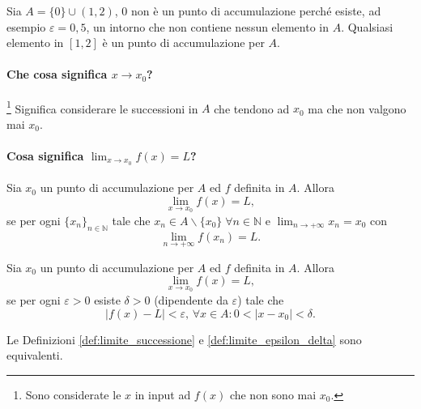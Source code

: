 \begin{example}
    Sia $A=\{0\}\cup(1,2)$, 0 non è un punto di accumulazione perché esiste, ad esempio $\varepsilon = 0,5$, un intorno che non contiene nessun elemento in $A$. Qualsiasi elemento in $[1,2]$ è un punto di accumulazione per $A$.
\end{example}

\paragraph{Che cosa significa $x\rightarrow x_0$?}\footnote{Sono considerate le $x$ in input ad $f(x)$ che non sono mai $x_0$.} Significa considerare le successioni in $A$ che tendono ad $x_0$ ma che non valgono mai $x_0$.

\paragraph{Cosa significa $\lim_{x\rightarrow x_0}f(x)=L$?}

\begin{definition}\label{def:limite_successione}
    Sia $x_0$ un punto di accumulazione per $A$ ed $f$ definita in $A$. Allora
    \begin{equation*}
        \lim_{x\rightarrow x_0}f(x)=L,
    \end{equation*}
    se per ogni $\{x_n\}_{n\in\mathbb N}$ tale che $x_n\in A\backslash\{x_0\}\;\forall n\in\mathbb N$ e $\lim_{n\rightarrow+\infty}x_n=x_0$ con
    \begin{equation*}
        \lim_{n\rightarrow+\infty}f(x_n)=L.
    \end{equation*}
\end{definition}

\begin{definition}\label{def:limite_epsilon_delta}
    Sia $x_0$ un punto di accumulazione per $A$ ed $f$ definita in $A$. Allora
    \begin{equation*}
        \lim_{x\rightarrow x_0}f(x)=L,
    \end{equation*}
    se per ogni $\varepsilon >0$ esiste $\delta>0$ (dipendente da $\varepsilon$) tale che
    \begin{equation*}
        |f(x)-L|<\varepsilon,\,\forall x\in A\colon 0<|x-x_0|<\delta.
    \end{equation*}
\end{definition}

\begin{proposition}
    Le Definizioni \ref{def:limite_successione} e \ref{def:limite_epsilon_delta} sono equivalenti.
\end{proposition}


